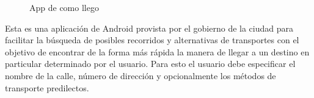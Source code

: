 \documentclass[10pt,a4paper]{article}
\begin{document}
\begin{figure}[ht]
    \caption{App de como llego}
\end{figure}

Esta es una aplicación de Android provista por el gobierno de la ciudad para facilitar la búsqueda de posibles recorridos y alternativas de transportes con el objetivo de encontrar de la forma más rápida la manera de llegar a un destino en particular determinado por el usuario. Para esto el usuario debe especificar el nombre de la calle, número de dirección y opcionalmente los métodos de transporte predilectos.
\end{document}
